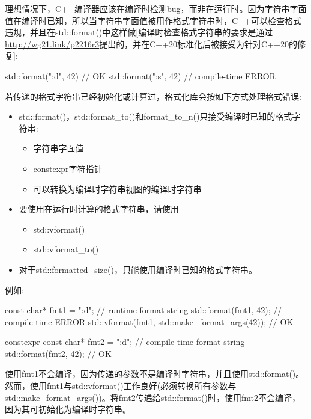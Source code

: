 理想情况下，C++编译器应该在编译时检测bug，而非在运行时。因为字符串字面值在编译时已知，所以当字符串字面值被用作格式字符串时，C++可以检查格式违规，并且在std::format()中这样做[编译时检查格式字符串的要求是通过\url{http://wg21.link/p2216r3}提出的，并在C++20标准化后被接受为针对C++20的修复]:

\begin{cpp}
std::format("{:d}", 42) // OK
std::format("{:s}", 42) // compile-time ERROR
\end{cpp}

若传递的格式字符串已经初始化或计算过，格式化库会按如下方式处理格式错误:

\begin{itemize}
\item
std::format()，std::format\_to()和format\_to\_n()只接受编译时已知的格式字符串:

\begin{itemize}
\item
字符串字面值

\item
constexpr字符指针

\item
可以转换为编译时字符串视图的编译时字符串
\end{itemize}

\item
要使用在运行时计算的格式字符串，请使用

\begin{itemize}
\item
std::vformat()

\item
std::vformat\_to()
\end{itemize}

\item
对于std::formatted\_size()，只能使用编译时已知的格式字符串。
\end{itemize}

例如:

\begin{cpp}
const char* fmt1 = "{:d}"; // runtime format string
std::format(fmt1, 42); // compile-time ERROR
std::vformat(fmt1, std::make_format_args(42)); // OK

constexpr const char* fmt2 = "{:d}"; // compile-time format string
std::format(fmt2, 42); // OK
\end{cpp}

使用fmt1不会编译，因为传递的参数不是编译时字符串，并且使用std::format()。然而，使用fmt1与std::vformat()工作良好(必须转换所有参数与std::make\_format\_args())。将fmt2传递给std::format()时，使用fmt2不会编译，因为其可初始化为编译时字符串。

